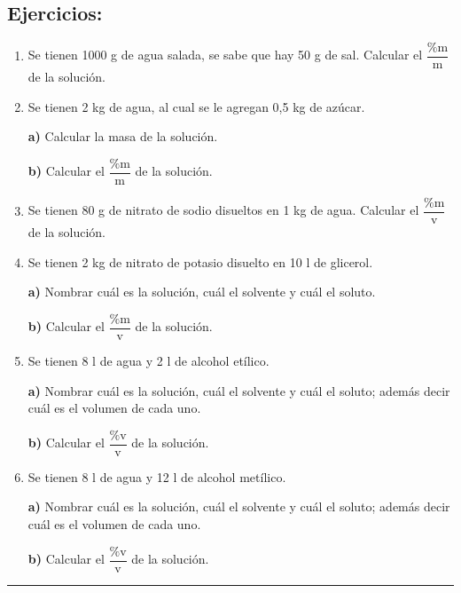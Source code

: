 \subsection*{Ejercicios:}

    \begin{enumerate}
    
    \item Se tienen 1000 g de agua salada, se sabe que hay 50 g de sal. Calcular el $\dfrac{\%\text{m}}{\text{m}}$ de la solución.
    
    \item Se tienen 2 kg de agua, al cual se le agregan 0,5 kg de azúcar. 
    
    \textbf{a)} Calcular la masa de la solución.
    
    \textbf{b)} Calcular el $\dfrac{\%\text{m}}{\text{m}}$ de la solución. 
    
    \item Se tienen 80 g de nitrato de sodio disueltos en 1 kg de agua. Calcular el $\dfrac{\%\text{m}}{\text{v}}$ de la solución.
    
    \item Se tienen 2 kg de nitrato de potasio disuelto en 10 l de glicerol. 
    
    \textbf{a)} Nombrar cuál es la solución, cuál el solvente y cuál el soluto.

    \textbf{b)} Calcular el $\dfrac{\%\text{m}}{\text{v}}$ de la solución.
    
    \item Se tienen 8 l de agua y 2 l de alcohol etílico. 
    
    \textbf{a)} Nombrar cuál es la solución, cuál el solvente y cuál el soluto; además decir cuál es el volumen de cada uno.

    \textbf{b)} Calcular el $\dfrac{\%\text{v}}{\text{v}}$ de la solución.
    
    \item Se tienen 8 l de agua y 12 l de alcohol metílico. 
    
    \textbf{a)} Nombrar cuál es la solución, cuál el solvente y cuál el soluto; además decir cuál es el volumen de cada uno.

    \textbf{b)} Calcular el $\dfrac{\%\text{v}}{\text{v}}$ de la solución.
    
    \end{enumerate}
    
    \hrule